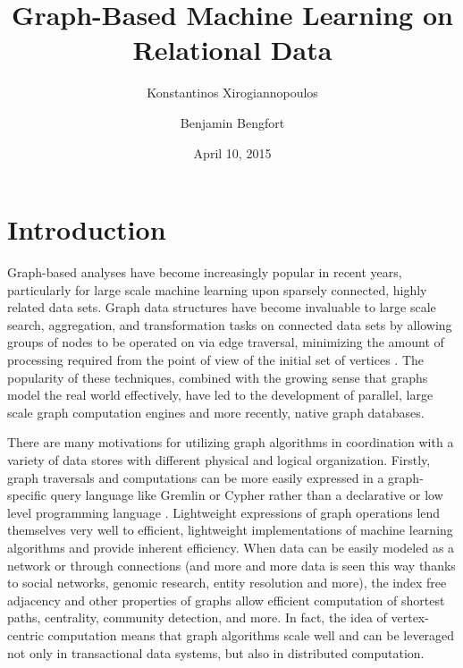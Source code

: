\documentclass[11pt,letterpaper]{article}
\begin{document}
\title{Graph-Based Machine Learning on Relational Data}

\author[ ]{Konstantinos Xirogiannopoulos}
\author[ ]{Benjamin Bengfort}

\date{April 10, 2015}

\maketitle


\section*{Introduction}

Graph-based analyses have become increasingly popular in recent years, particularly for large scale machine learning upon sparsely connected, highly related data sets. Graph data structures have become invaluable to large scale search, aggregation, and transformation tasks on connected data sets by allowing groups of nodes to be operated on via edge traversal, minimizing the amount of processing required from the point of view of the initial set of vertices \cite{berretti_efficient_2001}. The popularity of these techniques, combined with the growing sense that graphs model the real world effectively, have led to the development of parallel, large scale graph computation  engines and more recently, native graph databases.


There are many motivations for utilizing graph algorithms in coordination with a variety of data stores with different physical and logical organization. Firstly, graph traversals and computations can be more easily expressed in a graph-specific query language like Gremlin \cite{rodriguez_gremlin_2013} or Cypher \cite{miller_graph_2013} rather than a declarative or low level programming language \cite{rodriguez_exploring_2012}. Lightweight expressions of graph operations lend themselves very well to efficient, lightweight implementations of machine learning algorithms and provide inherent efficiency. When data can be easily modeled as a network or through connections (and more and more data is seen this way thanks to social networks, genomic research, entity resolution and more), the index free adjacency and other properties of graphs allow efficient computation of shortest paths, centrality, community detection, and more. In fact, the idea of vertex-centric computation \cite{malewicz_pregel:_2010} means that graph algorithms scale well and can be leveraged not only in transactional data systems, but also in distributed computation.
\end{document}

